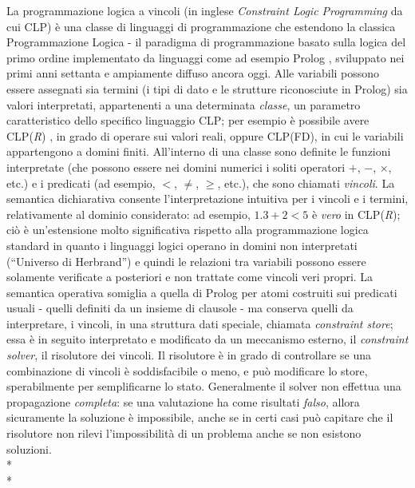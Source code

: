 \documentclass[12pt,a4paper,openright,twoside]{report}
\begin{document}
La programmazione logica a vincoli \cite{clpSurvey} (in inglese \emph{Constraint Logic Programming} da cui CLP) è una classe di linguaggi di programmazione che estendono la classica Programmazione Logica - il paradigma di programmazione basato sulla logica del primo ordine implementato da linguaggi come ad esempio Prolog \cite{Colmerauer,Kowalski,clocksin2003programming}, sviluppato nei primi anni settanta e ampiamente diffuso ancora oggi. Alle variabili possono essere assegnati sia termini (i tipi di dato e le strutture riconosciute in Prolog) sia valori interpretati, appartenenti a una determinata \emph{classe}, un parametro caratteristico dello specifico linguaggio CLP; per esempio è possibile avere CLP(\emph{R}) \cite{clpR}, in grado di operare sui valori reali, oppure CLP(FD), in cui le variabili appartengono a domini finiti. All'interno di una classe sono definite le funzioni interpretate (che possono essere nei domini numerici i soliti operatori $+$, $-$, $\times$, etc.) e i predicati (ad esempio, $<$, $\neq$, $\geq$, etc.), che sono chiamati \emph{vincoli}. La semantica dichiarativa consente l'interpretazione intuitiva per i vincoli e i termini, relativamente al dominio considerato: ad esempio, $1.3+2<5$ è \emph{vero} in CLP(\emph{R}); ciò è un'estensione molto significativa rispetto alla programmazione logica standard in quanto i linguaggi logici operano in domini non interpretati (``Universo di Herbrand'') e quindi le relazioni tra variabili possono essere solamente verificate a posteriori e non trattate come vincoli veri propri. La semantica operativa somiglia a quella di Prolog per atomi costruiti sui predicati usuali - quelli definiti da un insieme di clausole - ma conserva quelli da interpretare, i vincoli, in una struttura dati speciale, chiamata \emph{constraint store}; essa è in seguito interpretato e modificato da un meccanismo esterno, il \emph{constraint solver}, il risolutore dei vincoli. Il risolutore è in grado di controllare se una combinazione di vincoli è soddisfacibile o meno, e può modificare lo store, sperabilmente per semplificarne lo stato. Generalmente il solver non effettua una propagazione \emph{completa}: se una valutazione ha come risultati \emph{falso}, allora sicuramente la soluzione è impossibile, anche se in certi casi può capitare che il risolutore non rilevi l'impossibilità di un problema anche se non esistono soluzioni.\\*\\*  
\end{document}
